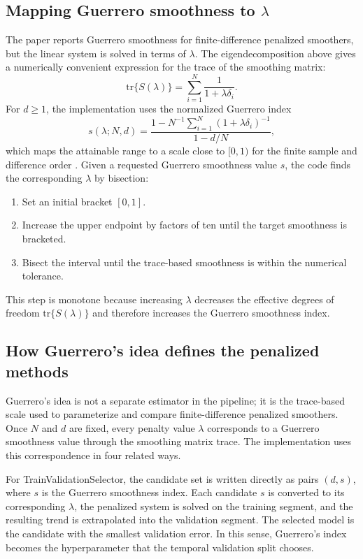 \subsection{Mapping Guerrero smoothness to \texorpdfstring{\(\lambda\)}{lambda}}
The paper reports Guerrero smoothness for finite-difference penalized smoothers,
but the linear system is solved in terms of \(\lambda\). The eigendecomposition
above gives a numerically convenient expression for the trace of the smoothing
matrix:
\[
  \mathrm{tr}\{S(\lambda)\}
  =
  \sum_{i=1}^N \frac{1}{1+\lambda\delta_i}.
\]
For \(d\ge 1\), the implementation uses the normalized Guerrero index
\begin{equation}
\label{eq:algorithm_guerrero_normalized}
  s(\lambda;N,d)
  =
  \frac{
    1 - N^{-1}\sum_{i=1}^N (1+\lambda\delta_i)^{-1}
  }{
    1-d/N
  },
\end{equation}
which maps the attainable range to a scale close to \([0,1)\) for the finite
sample and difference order \citep{guerrero2007penalized}. Given a requested
Guerrero smoothness value \(s\), the code finds the corresponding \(\lambda\)
by bisection:
\begin{enumerate}
  \item Set an initial bracket \([0,1]\).
  \item Increase the upper endpoint by factors of ten until the target
        smoothness is bracketed.
  \item Bisect the interval until the trace-based smoothness is within the
        numerical tolerance.
\end{enumerate}
This step is monotone because increasing \(\lambda\) decreases the effective
degrees of freedom \(\mathrm{tr}\{S(\lambda)\}\) and therefore increases the
Guerrero smoothness index.

\subsection{How Guerrero's idea defines the penalized methods}
Guerrero's idea is not a separate estimator in the pipeline; it is the
trace-based scale used to parameterize and compare finite-difference penalized
smoothers. Once \(N\) and \(d\) are fixed, every penalty value \(\lambda\)
corresponds to a Guerrero smoothness value through the smoothing matrix trace.
The implementation uses this correspondence in four related ways.

For TrainValidationSelector, the candidate set is written directly as pairs
\((d,s)\), where \(s\) is the Guerrero smoothness index. Each candidate \(s\)
is converted to its corresponding \(\lambda\), the penalized system is solved
on the training segment, and the resulting trend is extrapolated into the
validation segment. The selected model is the candidate with the smallest
validation error. In this sense, Guerrero's index becomes the hyperparameter
that the temporal validation split chooses.

